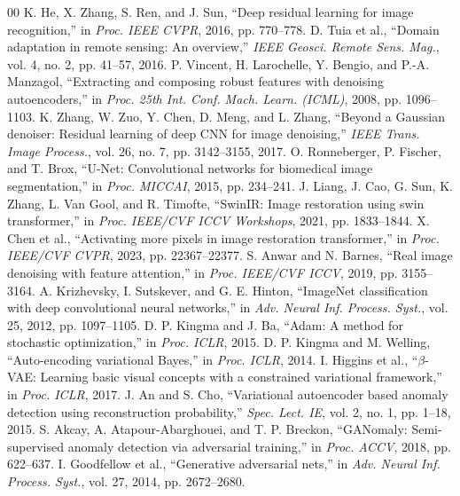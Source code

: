 \documentclass[journal]{IEEEtran}
\begin{document}
\begin{thebibliography}{00}
 K. He, X. Zhang, S. Ren, and J. Sun, ``Deep residual learning for image recognition,'' in \textit{Proc. IEEE CVPR}, 2016, pp. 770--778.
 D. Tuia et al., ``Domain adaptation in remote sensing: An overview,'' \textit{IEEE Geosci. Remote Sens. Mag.}, vol. 4, no. 2, pp. 41--57, 2016.
 P. Vincent, H. Larochelle, Y. Bengio, and P.-A. Manzagol, ``Extracting and composing robust features with denoising autoencoders,'' in \textit{Proc. 25th Int. Conf. Mach. Learn. (ICML)}, 2008, pp. 1096--1103.
 K. Zhang, W. Zuo, Y. Chen, D. Meng, and L. Zhang, ``Beyond a Gaussian denoiser: Residual learning of deep CNN for image denoising,'' \textit{IEEE Trans. Image Process.}, vol. 26, no. 7, pp. 3142--3155, 2017.
 O. Ronneberger, P. Fischer, and T. Brox, ``U-Net: Convolutional networks for biomedical image segmentation,'' in \textit{Proc. MICCAI}, 2015, pp. 234--241.
 J. Liang, J. Cao, G. Sun, K. Zhang, L. Van Gool, and R. Timofte, ``SwinIR: Image restoration using swin transformer,'' in \textit{Proc. IEEE/CVF ICCV Workshops}, 2021, pp. 1833--1844.
 X. Chen et al., ``Activating more pixels in image restoration transformer,'' in \textit{Proc. IEEE/CVF CVPR}, 2023, pp. 22367--22377.
 S. Anwar and N. Barnes, ``Real image denoising with feature attention,'' in \textit{Proc. IEEE/CVF ICCV}, 2019, pp. 3155--3164.
 A. Krizhevsky, I. Sutskever, and G. E. Hinton, ``ImageNet classification with deep convolutional neural networks,'' in \textit{Adv. Neural Inf. Process. Syst.}, vol. 25, 2012, pp. 1097--1105.
 D. P. Kingma and J. Ba, ``Adam: A method for stochastic optimization,'' in \textit{Proc. ICLR}, 2015.
 D. P. Kingma and M. Welling, ``Auto-encoding variational Bayes,'' in \textit{Proc. ICLR}, 2014.
 I. Higgins et al., ``$\beta$-VAE: Learning basic visual concepts with a constrained variational framework,'' in \textit{Proc. ICLR}, 2017.
 J. An and S. Cho, ``Variational autoencoder based anomaly detection using reconstruction probability,'' \textit{Spec. Lect. IE}, vol. 2, no. 1, pp. 1--18, 2015.
 S. Akcay, A. Atapour-Abarghouei, and T. P. Breckon, ``GANomaly: Semi-supervised anomaly detection via adversarial training,'' in \textit{Proc. ACCV}, 2018, pp. 622--637.
 I. Goodfellow et al., ``Generative adversarial nets,'' in \textit{Adv. Neural Inf. Process. Syst.}, vol. 27, 2014, pp. 2672--2680.

\end{thebibliography}
\end{document}

